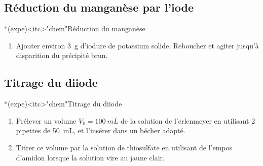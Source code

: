 \documentclass[../main/main.tex]{subfiles}
\begin{document}
\subsection{Réduction du manganèse par l'iode}
\begin{tcb}*(expe)<itc>"chem"{Réduction du manganèse}
	\begin{enumerate}
		\item Ajouter environ \SI{3}{g} d'iodure de potassium solide. Reboucher et
		      agiter jusqu'à disparition du précipité brun.
	\end{enumerate}
\end{tcb}

%

\subsection{Titrage du diiode}
\begin{tcb}*(expe)<itc>"chem"{Titrage du diiode}
	\begin{enumerate}
		\item Prélever un volume $V_0 = \SI{100}{mL}$ de la solution de l'erlenmeyer
		      en utilisant 2 pipettes de \SI{50}{mL}, et l'insérer dans un bécher
		      adapté.
		\item Titrer ce volume par la solution de thiosulfate en utilisant de
		      l'empos d'amidon lorsque la solution vire au jaune clair.
	\end{enumerate}
\end{tcb}

%
%
\end{document}
